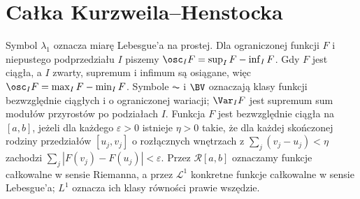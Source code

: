 \section{Całka Kurzweila--Henstocka}
\providecommand{\atlasref}[2]{#2}
\label{it:sec:kurzweil-henstock}\label{ma1:ch:kurzweil-henstock}
Symbol $\lambda_1$ oznacza miarę Lebesgue'a na prostej. Dla ograniczonej funkcji $F$ i niepustego podprzedziału $I$ piszemy $\osc_I F=\sup_I F-\inf_I F$. Gdy $F$ jest ciągła, a $I$ zwarty, supremum i infimum są osiągane, więc $\osc_I F=\max_I F-\min_I F$. Symbole $\AC$ i $\BV$ oznaczają klasy funkcji bezwzględnie ciągłych i o ograniczonej wariacji; $\Var_I F$ jest supremum sum modułów przyrostów po podziałach $I$. Funkcja $F$ jest bezwzględnie ciągła na $[a,b]$, jeżeli dla każdego $\varepsilon>0$ istnieje $\eta>0$ takie, że dla każdej skończonej rodziny przedziałów $[u_j,v_j]$ o rozłącznych wnętrzach z $\sum_j(v_j-u_j)<\eta$ zachodzi $\sum_j|F(v_j)-F(u_j)|<\varepsilon$. Przez $\mathcal R[a,b]$ oznaczamy funkcje całkowalne w sensie Riemanna, a przez $\mathcal L^1$ konkretne funkcje całkowalne w sensie Lebesgue'a; $L^1$ oznacza ich klasy równości prawie wszędzie.
